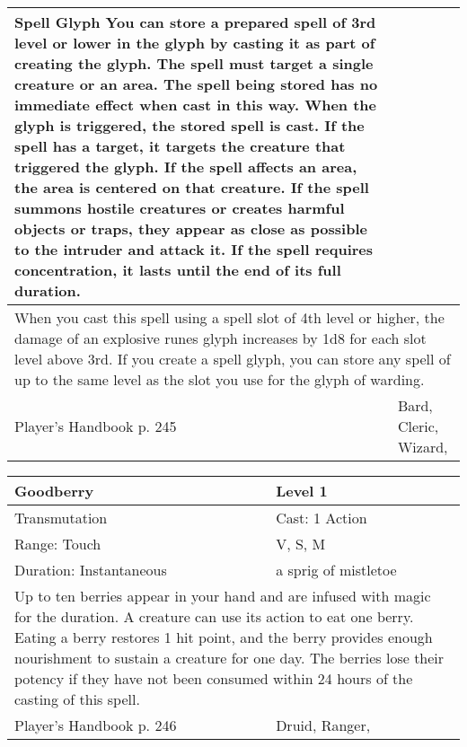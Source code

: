 \documentclass[11pt]{report}
\begin{document}
\begin{table}[H]
\begin{tabular}{||p{6cm}|p{6cm}||}
{Spell Glyph
You can store a prepared spell of 3rd level or lower in the glyph by casting it as part of creating the glyph. The spell must target a single creature or an area. The spell being stored has no immediate effect when cast in this way. When the glyph is triggered, the stored spell is cast. If the spell has a target, it targets the creature that triggered the glyph. If the spell affects an area, the area is centered on that creature. If the spell summons hostile creatures or creates harmful objects or traps, they appear as close as possible to the intruder and attack it. If the spell requires concentration, it lasts until the end of its full duration.}\\ \hline
		\multicolumn{2}{||p{12cm}||}{When you cast this spell using a spell slot of 4th level or higher, the damage of an explosive runes glyph increases by 1d8 for each slot level above 3rd. If you create a spell glyph, you can store any spell of up to the same level as the slot you use for the glyph of warding.}\\ \hline
Player's Handbook p. 245 & Bard, Cleric, Wizard, \\ \hline\hline
	\end{tabular}
\end{table}

\begin{table}[H]
	\begin{tabular}{||p{6cm}|p{6cm}||}
		\hline\hline
		\bf{Goodberry} & Level 1\\ \hline
		Transmutation & Cast: 1 Action\\ \hline
		Range: Touch & V, S, M\\ \hline
		Duration: Instantaneous & a sprig of mistletoe\\ \hline
		\multicolumn{2}{||p{12cm}||}{Up to ten berries appear in your hand and are infused with magic for the duration. A creature can use its action to eat one berry. Eating a berry restores 1 hit point, and the berry provides enough nourishment to sustain a creature for one day.
The berries lose their potency if they have not been consumed within 24 hours of the casting of this spell.}\\ \hline
Player's Handbook p. 246 & Druid, Ranger, \\ \hline\hline
	\end{tabular}
\end{table}
\end{document}
